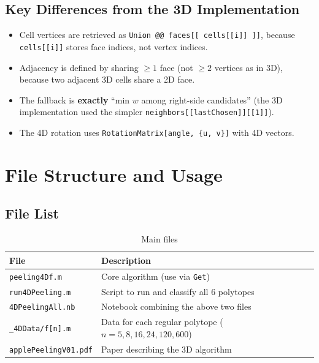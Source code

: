 \documentclass[12pt,a4paper]{article}
\theoremstyle{definition}
\begin{document}
\subsection{Key Differences from the 3D Implementation}

\begin{itemize}
  \item Cell vertices are retrieved as
        \texttt{Union @@ faces[[ cells[[i]] ]]},
        because \texttt{cells[[i]]} stores face indices, not vertex indices.
  \item Adjacency is defined by sharing $\geq 1$ face (not $\geq 2$ vertices
        as in 3D), because two adjacent 3D cells share a 2D face.
  \item The fallback is \textbf{exactly} ``min $w$ among right-side
        candidates'' (the 3D implementation used the simpler
        \texttt{neighbors[[lastChosen]][[1]]}).
  \item The 4D rotation uses \texttt{RotationMatrix[angle, \{u, v\}]}
        with 4D vectors.
\end{itemize}


\section{File Structure and Usage}

\subsection{File List}

\begin{table}[h]
\centering
\caption{Main files}
\begin{tabular}{ll}
\toprule
File & Description \\
\midrule
\texttt{peeling4Df.m}       & Core algorithm (use via \texttt{Get}) \\
\texttt{run4DPeeling.m}     & Script to run and classify all 6 polytopes \\
\texttt{4DPeelingAll.nb}    & Notebook combining the above two files \\
\texttt{\_4DData/f[n].m}    & Data for each regular polytope ($n=5,8,16,24,120,600$) \\
\texttt{applePeelingV01.pdf}& Paper describing the 3D algorithm \\
\bottomrule
\end{tabular}
\end{table}
\end{document}
